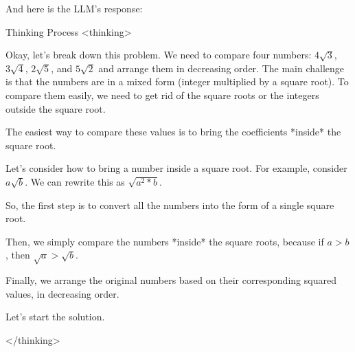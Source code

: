 \documentclass[
    a4paper, %
    10pt, %
    twoside, %
]{LTJournalArticle}
\begin{document}
And here is the LLM's response:

\begin{studentbox}{Thinking Process}
    <thinking>

    Okay, let's break down this problem. We need to compare four numbers:  $4\sqrt3$, $3\sqrt4$, $2\sqrt5$, and $5\sqrt2$ and arrange them in decreasing order. The main challenge is that the numbers are in a mixed form (integer multiplied by a square root). To compare them easily, we need to get rid of the square roots or the integers outside the square root.

    \vspace{1em}

    The easiest way to compare these values is to bring the coefficients *inside* the square root.

    \vspace{1em}

    Let's consider how to bring a number inside a square root. For example, consider $a\sqrt{b}$. We can rewrite this as $\sqrt{a^2 * b}$.

    \vspace{1em}

    So, the first step is to convert all the numbers into the form of a single square root.

    \vspace{1em}

    Then, we simply compare the numbers *inside* the square roots, because if $a > b$, then $\sqrt{a} > \sqrt{b}$.

    \vspace{1em}

    Finally, we arrange the original numbers based on their corresponding squared values, in decreasing order.

    \vspace{1em}

    Let's start the solution.

    </thinking>

    \vspace{1em}
\end{studentbox}
\end{document}
